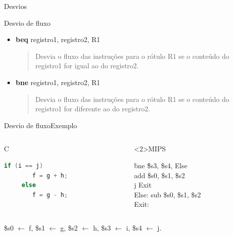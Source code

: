 \begin{frame}{Desvios}
\vspace{-0.25cm}
\begin{block}{Desvio de fluxo}
  \begin{itemize}
  \item {\bf beq} registro1, registro2, R1
    \begin{quote}
      { Desvia o fluxo das instruções para o rótulo R1 se o conteúdo do
      registro1 for \alert{igual} ao do registro2.}
    \end{quote}
  \item {\bf bne} registro1, registro2, R1
    \begin{quote}
      { Desvia o fluxo das instruções para o rótulo R1 se o conteúdo do
      registro1 for \alert{diferente} ao do registro2.}
    \end{quote}
  \end{itemize}
\end{block}
\end{frame}

\begin{frame}[fragile]{Desvio de fluxo}{Exemplo}

\begin{columns}
\begin{column}{.3\textwidth}
\begin{block}{C}
  \begin{lstlisting}[language=C]
     if (i == j) 
        f = g + h; 
     else 
        f = g - h;
  \end{lstlisting}
\end{block}
\end{column}
\begin{column}{.65\textwidth}
  \begin{block}<2>{MIPS}
    \begin{tt}
      \begin{tabbing}
        \hspace{1cm}\=\hspace{1.5cm}\= bne\hspace{.3cm} \=\$s3, \$s4, Else\\
        \>\>add \> \$s0, \$s1, \$s2\\
        \>\>j \>Exit\\
        \>Else:\> sub \> \$s0, \$s1, \$s2 \\
        \>Exit:\\
      \end{tabbing}
    \end{tt}
  \end{block}
\end{column}
\end{columns}

\vfill\footnotesize
\$s0 $\leftarrow$ f, \$s1 $\leftarrow$ g, \$s2 $\leftarrow$ h, \$s3
  $\leftarrow$ i, \$s4 $\leftarrow$ j.\\
\end{frame}

